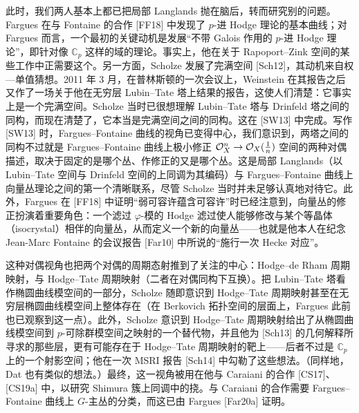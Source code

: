 此时，我们两人基本上都已把局部 Langlands 抛在脑后，转而研究别的问题。Fargues 在与 Fontaine 的合作 [FF18] 中发现了 $p$-进 Hodge 理论的基本曲线；对 Fargues 而言，一个最初的关键动机是发展“不带 Galois 作用的 $p$-进 Hodge 理论”，即针对像 $\mathbb{C}_p$ 这样的域的理论。事实上，他在关于 Rapoport--Zink 空间的某些工作中正需要这个。另一方面，Scholze 发展了完满空间 [Sch12]，其动机来自权—单值猜想。2011 年 3 月，在普林斯顿的一次会议上，Weinstein 在其报告之后又作了一场关于他在无穷层 Lubin--Tate 塔上结果的报告，这使人们清楚：它事实上是一个完满空间。Scholze 当时已很想理解 Lubin--Tate 塔与 Drinfeld 塔之间的同构，而现在清楚了，它本当是完满空间之间的同构。这在 [SW13] 中完成。写作 [SW13] 时，Fargues--Fontaine 曲线的视角已变得中心，我们意识到，两塔之间的同构不过就是 Fargues--Fontaine 曲线上极小修正 $\mathcal{O}_X^n\to\mathcal{O}_X(\frac{1}{n})$ 空间的两种对偶描述，取决于固定的是哪个丛、作修正的又是哪个丛。这是局部 Langlands（以 Lubin--Tate 空间与 Drinfeld 空间的上同调为其编码）与 Fargues--Fontaine 曲线上向量丛理论之间的第一个清晰联系，尽管 Scholze 当时并未足够认真地对待它。此外，Fargues 在 [FF18] 中证明“弱可容许蕴含可容许”时已经注意到，向量丛的修正扮演着重要角色：一个滤过 $\varphi$-模的 Hodge 滤过使人能够修改与某个等晶体（isocrystal）相伴的向量丛，从而定义一个新的向量丛——也就是他本人在纪念 Jean-Marc Fontaine 的会议报告 [Far10] 中所说的“施行一次 Hecke 对应”。

这种对偶视角也把两个对偶的周期态射推到了关注的中心：Hodge--de Rham 周期映射，与 Hodge--Tate 周期映射（二者在对偶同构下互换）。把 Lubin--Tate 塔看作椭圆曲线模空间的一部分，Scholze 随即意识到 Hodge--Tate 周期映射甚至在无穷层椭圆曲线模空间上整体存在（在 Berkovich 拓扑空间的层面上，Fargues 此前也已观察到这一点）。此外，Scholze 意识到 Hodge--Tate 周期映射给出了从椭圆曲线模空间到 $p$-可除群模空间之映射的一个替代物，并且他为 [Sch13] 的几何解释所寻求的那些层，更有可能存在于 Hodge--Tate 周期映射的靶上——后者不过是 $\mathbb{C}_p$ 上的一个射影空间；他在一次 MSRI 报告 [Sch14] 中勾勒了这些想法。（同样地，Dat 也有类似的想法。）最终，这一视角被用在他与 Caraiani 的合作 [CS17]、[CS19a] 中，以研究 Shimura 簇上同调中的挠。与 Caraiani 的合作需要 Fargues--Fontaine 曲线上 $G$-主丛的分类，而这已由 Fargues [Far20a] 证明。

